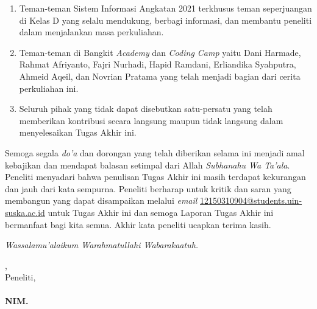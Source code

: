 \begin{enumerate}
	\item Teman-teman Sistem Informasi Angkatan 2021 terkhusus teman seperjuangan di Kelas D yang selalu mendukung, berbagi informasi, dan membantu peneliti dalam menjalankan masa perkuliahan.
	\item Teman-teman di Bangkit \textit{Academy} dan \textit{Coding Camp} yaitu Dani Harmade, Rahmat Afriyanto, Fajri Nurhadi, Hapid Ramdani, Erliandika Syahputra, Ahmeid Aqeil, dan Novrian Pratama yang telah menjadi bagian dari cerita perkuliahan ini.
	\item Seluruh pihak yang tidak dapat disebutkan satu-persatu yang telah memberikan kontribusi secara langsung maupun tidak langsung dalam menyelesaikan Tugas Akhir ini.
\end{enumerate}

Semoga segala \textit{do'a} dan dorongan yang telah diberikan selama ini menjadi amal kebajikan dan mendapat balasan setimpal dari Allah \textit{Subhanahu Wa Ta’ala}. Peneliti menyadari bahwa penulisan Tugas Akhir ini masih terdapat kekurangan dan jauh dari kata sempurna. Peneliti berharap untuk kritik dan saran yang membangun yang dapat disampaikan melalui \textit{email} \href{mailto:12150310904@students.uin-suska.ac.id}{12150310904@students.uin-suska.ac.id} untuk Tugas Akhir ini dan semoga Laporan Tugas Akhir ini bermanfaat bagi kita semua. Akhir kata peneliti ucapkan terima kasih.

\textit{Wassalamu’alaikum Warahmatullahi Wabarakaatuh.}

\vspace*{0.1cm}



\begin{flushright}
	\kota, \tanggalPersetujuan\\
	Peneliti,\\
	\vspace{2cm}
	\textbf{\underline{\penulis}\\
		\vspace{-0.15cm}
		NIM. \nim}

\end{flushright}
